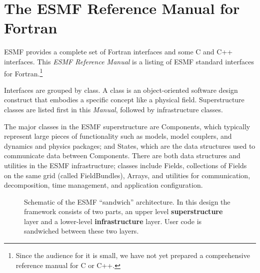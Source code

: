 

\section{The ESMF Reference Manual for Fortran}

ESMF provides a complete set of Fortran interfaces and
some C and C++ interfaces.  This {\it ESMF Reference Manual} is a listing of 
ESMF standard interfaces for Fortran.\footnote{Since the audience for it is 
small, we have not yet prepared a comprehensive reference manual for C 
or C++.}  

Interfaces are grouped by class.  A class is an object-oriented software 
design construct that embodies 
a specific concept like a physical field.  Superstructure classes 
are listed first in this {\it Manual}, followed by infrastructure 
classes.

The major classes in the ESMF superstructure are Components, which 
typically represent
large pieces of functionality such as models, model couplers, and 
dynamics and physics packages; and States, which are the data structures
used to communicate data between Components.  There are both data
structures and utilities in the ESMF 
infrastructure; classes include Fields, collections of Fields on the 
same grid (called FieldBundles), Arrays, and utilities for communication,
decomposition, time management, and application configuration.

\begin{center}
\begin{figure}
\caption{Schematic of the ESMF ``sandwich'' architecture. In this
design the framework consists of two parts, an upper level
{\bf superstructure} layer and a lower-level {\bf infrastructure} layer.
User code is sandwiched between these two layers.}
\label{fig:TheESMFwich}
\end{figure}
\end{center}

